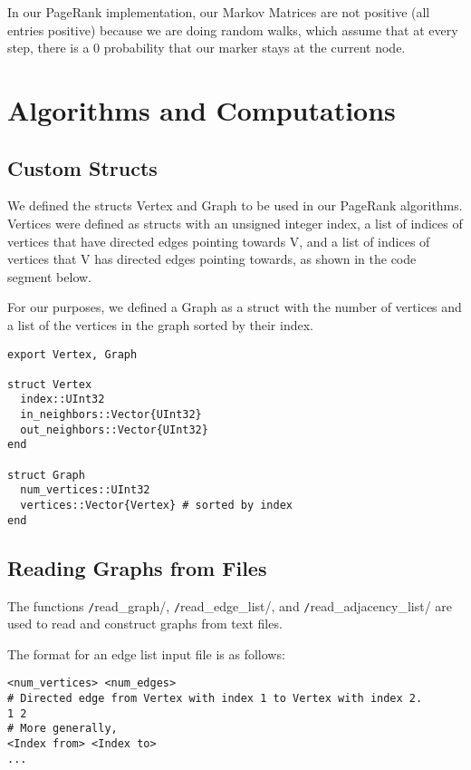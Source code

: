 \documentclass[12pt, titlepage, twoside]{amsart}
\theoremstyle{remark}
\begin{document}
In our PageRank implementation, our Markov Matrices are not positive (all entries positive) because we are doing random walks, which assume that at every step, there is a 0 probability that our marker stays at the current node.


\clearpage

\section{Algorithms and Computations}

\subsection{Custom Structs}

We defined the structs Vertex and Graph to be used in our PageRank algorithms. 
Vertices were defined as structs with an unsigned integer index, a list of indices of vertices that have directed edges pointing towards V, 
and a list of indices of vertices that V has directed edges pointing towards, 
as shown in the code segment below. 

For our purposes, we defined a Graph as a struct with the number of vertices and a list of the vertices in the graph sorted by their index.

\begin{verbatim}
export Vertex, Graph

struct Vertex
  index::UInt32
  in_neighbors::Vector{UInt32}
  out_neighbors::Vector{UInt32}
end

struct Graph
  num_vertices::UInt32
  vertices::Vector{Vertex} # sorted by index
end
\end{verbatim}

\subsection{Reading Graphs from Files}

The functions \texttt/read_graph/, \texttt/read_edge_list/, and \texttt/read_adjacency_list/ are used to read and construct graphs from text files.

The format for an edge list input file is as follows:

\begin{verbatim}
<num_vertices> <num_edges>
# Directed edge from Vertex with index 1 to Vertex with index 2.
1 2
# More generally,
<Index from> <Index to>
...
\end{verbatim}
\end{document}
